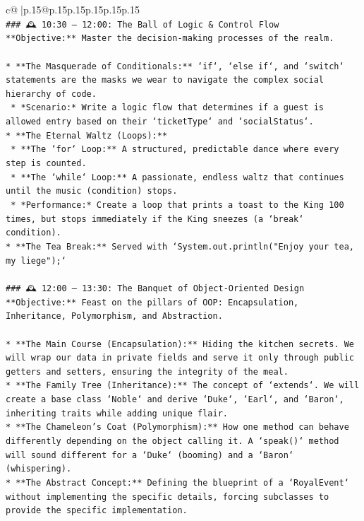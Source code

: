 \documentclass{article}
\begin{document}
{\begin{supertabular}{c@{$\;$}|p{.15\linewidth}@{}p{.15\linewidth}p{.15\linewidth}p{.15\linewidth}p{.15\linewidth}p{.15\linewidth}}
{{{\\ 
\texttt{\#\#\# 🕰️ 10:30 – 12:00: The Ball of Logic \& Control Flow} \\
\texttt{**Objective:** Master the decision{-}making processes of the realm.} \\
\\ 
\texttt{*   **The Masquerade of Conditionals:** `if`, `else if`, and `switch` statements are the masks we wear to navigate the complex social hierarchy of code.} \\
\texttt{    *   *Scenario:* Write a logic flow that determines if a guest is allowed entry based on their `ticketType` and `socialStatus`.} \\
\texttt{*   **The Eternal Waltz (Loops):**} \\
\texttt{    *   **The `for` Loop:** A structured, predictable dance where every step is counted.} \\
\texttt{    *   **The `while` Loop:** A passionate, endless waltz that continues until the music (condition) stops.} \\
\texttt{    *   *Performance:* Create a loop that prints a toast to the King 100 times, but stops immediately if the King sneezes (a `break` condition).} \\
\texttt{*   **The Tea Break:** Served with `System.out.println("Enjoy your tea, my liege");`} \\
\\ 
\texttt{\#\#\# 🕰️ 12:00 – 13:30: The Banquet of Object{-}Oriented Design} \\
\texttt{**Objective:** Feast on the pillars of OOP: Encapsulation, Inheritance, Polymorphism, and Abstraction.} \\
\\ 
\texttt{*   **The Main Course (Encapsulation):** Hiding the kitchen secrets. We will wrap our data in private fields and serve it only through public getters and setters, ensuring the integrity of the meal.} \\
\texttt{*   **The Family Tree (Inheritance):** The concept of `extends`. We will create a base class `Noble` and derive `Duke`, `Earl`, and `Baron`, inheriting traits while adding unique flair.} \\
\texttt{*   **The Chameleon's Coat (Polymorphism):** How one method can behave differently depending on the object calling it. A `speak()` method will sound different for a `Duke` (booming) and a `Baron` (whispering).} \\
\texttt{*   **The Abstract Concept:** Defining the blueprint of a `RoyalEvent` without implementing the specific details, forcing subclasses to provide the specific implementation.} \\
}}}
\end{supertabular}}
\end{document}
